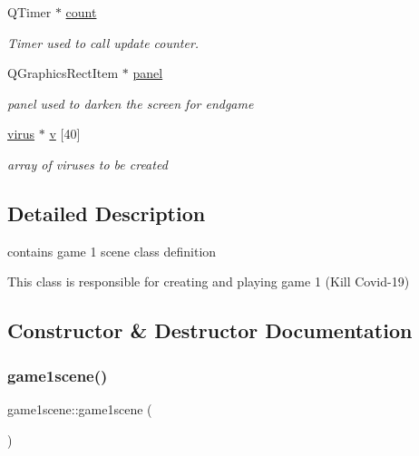 \begin{DoxyCompactItemize}
\mbox{\label{classgame1scene_a72a8f8545ebeb87af34de472448c8ec1}} 
Q\+Timer $\ast$ \hyperlink{classgame1scene_a72a8f8545ebeb87af34de472448c8ec1}{count}
\begin{DoxyCompactList}\small\item\em Timer used to call update counter. \end{DoxyCompactList}\item 
\mbox{\label{classgame1scene_a9889692b03cc597f2c5766068e81b16f}} 
Q\+Graphics\+Rect\+Item $\ast$ \hyperlink{classgame1scene_a9889692b03cc597f2c5766068e81b16f}{panel}
\begin{DoxyCompactList}\small\item\em panel used to darken the screen for endgame \end{DoxyCompactList}\item 
\mbox{\label{classgame1scene_af1eb126df2c67773e8d369465ad194ca}} 
\hyperlink{classvirus}{virus} $\ast$ \hyperlink{classgame1scene_af1eb126df2c67773e8d369465ad194ca}{v} \mbox{[}40\mbox{]}
\begin{DoxyCompactList}\small\item\em array of viruses to be created \end{DoxyCompactList}\end{DoxyCompactItemize}


\subsection{Detailed Description}
contains game 1 scene class definition 

This class is responsible for creating and playing game 1 (Kill Covid-\/19) 

\subsection{Constructor \& Destructor Documentation}
\mbox{\label{classgame1scene_ac540834f7d119c2c89a7e17306e2a1c0}} 
\subsubsection{\texorpdfstring{game1scene()}{game1scene()}}
{\footnotesize\ttfamily game1scene\+::game1scene (\begin{DoxyParamCaption}{ }\end{DoxyParamCaption})}



